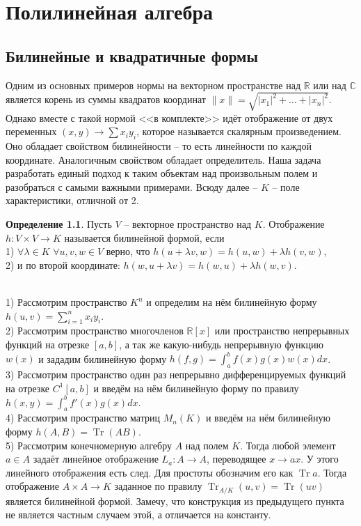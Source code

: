 \documentclass[10pt,a4paper,oneside]{book} %
\theoremstyle{definition}
\newtheorem*{defn}{Определение}
\newcommand{\mb}[1]{\mathbb{#1}}
\newcommand{\Tr}{\operatorname{Tr}}
\newcommand{\tr}{\operatorname{Tr}}
\def\exm{\noindent {\bf Примеры:}}
\def\dfn{\begin{defn}}
\def\edfn{\end{defn}}
\begin{document}
\chapter{Полилинейная алгебра}

\section{Билинейные и квадратичные формы}

Одним из основных примеров нормы на векторном пространстве над $\mb R$ или над $\mb C$ является корень из суммы квадратов координат $\|x\|=\sqrt{|x_1|^2+\dots +|x_n|^2}$. Однако вместе с такой нормой <<в комплекте>> идёт отображение от двух переменных $(x,y) \to \sum x_iy_i$, которое называется скалярным произведением. Оно обладает свойством билинейности -- то есть линейности по каждой координате. Аналогичным свойством обладает определитель. Наша задача разработать единый подход к таким объектам над произвольным полем и разобраться с самыми важными примерами.  
Всюду далее -- $K$ -- поле характеристики, отличной от 2.

\dfn Пусть $V$ -- векторное пространство над $K$. Отображение $h\colon V\times V \to K$ называется билинейной формой, если\\
1) $\forall \lambda \in K$ $\forall u,v,w \in V$ верно, что $h(u+\lambda v, w) = h(u,w)+\lambda h(v,w)$,\\
2) и по второй координате: $h( w, u+\lambda v) = h(w,u)+\lambda h(w,v)$.
\edfn

\exm\\
1) Рассмотрим пространство $K^n$ и определим на нём билинейную форму $h(u,v)=\sum_{i=1}^n x_iy_i$.\\
2) Рассмотрим пространство многочленов $\mb R[x]$ или пространство непрерывных функций на отрезке $[a,b]$, а так же какую-нибудь непрерывную функцию $w(x)$ и зададим билинейную форму $h(f,g)=\int_a^b f(x)g(x)w(x)dx$.\\
3) Рассмотрим пространство один раз непрерывно дифференцируемых функций на отрезке $C^1[a,b]$ и введём на нём билинейную форму по правилу $h(x,y)=\int_a^b f'(x)g(x)dx$.\\
4) Рассмотрим пространство матриц $M_n(K)$ и введём на нём билинейную форму $h(A,B)= \Tr(AB)$.\\
5) Рассмотрим конечномерную алгебру $A$ над полем $K$. Тогда любой элемент $a\in A$ задаёт линейное отображение $L_a \colon A \to A$, переводящее $x\to ax$. У этого линейного отображения есть след. Для простоты обозначим его как $\tr a$.
Тогда отображение $A\times A \to K$ заданное по правилу $\tr_{A/K}(u,v)=\tr(uv)$ является билинейной формой. Замечу, что конструкция из предыдущего пункта не является частным случаем этой, а отличается на константу.\\
\end{document}
